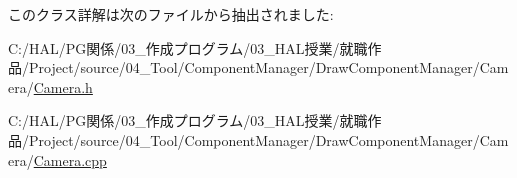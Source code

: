 このクラス詳解は次のファイルから抽出されました\+:\begin{DoxyCompactItemize}
\item 
C\+:/\+H\+A\+L/\+P\+G関係/03\+\_\+作成プログラム/03\+\_\+\+H\+A\+L授業/就職作品/\+Project/source/04\+\_\+\+Tool/\+Component\+Manager/\+Draw\+Component\+Manager/\+Camera/\mbox{\hyperlink{_camera_8h}{Camera.\+h}}\item 
C\+:/\+H\+A\+L/\+P\+G関係/03\+\_\+作成プログラム/03\+\_\+\+H\+A\+L授業/就職作品/\+Project/source/04\+\_\+\+Tool/\+Component\+Manager/\+Draw\+Component\+Manager/\+Camera/\mbox{\hyperlink{_camera_8cpp}{Camera.\+cpp}}\end{DoxyCompactItemize}
